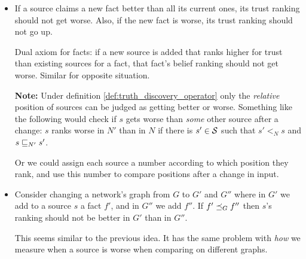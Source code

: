 \documentclass[../main.tex]{subfiles}
\begin{document}
\begin{itemize}
\item If a source claims a new fact better than all its current ones, its trust
ranking should not get worse. Also, if the new fact is worse, its trust ranking
should not go up.

Dual axiom for facts: if a new source is added that ranks higher for trust than
existing sources for a fact, that fact's belief ranking should not get worse.
Similar for opposite situation.

\textbf{Note:} Under definition \ref{def:truth_discovery_operator} only the
\emph{relative} position of sources can be judged as getting better or worse.
Something like the following would check if $s$ gets worse than \emph{some}
other source after a change: $s$ ranks worse in $N'$ than in $N$ if there is
$s' \in \S$ such that $s' <_N s$ and $s \sle_{N'} s'$.

Or we could assign each source a number according to which position they rank,
and use this number to compare positions after a change in input.

\item Consider changing a network's graph from $G$ to $G'$ and $G''$ where in
$G'$ we add to a source $s$ a fact $f'$, and in $G''$ we add $f''$. If $f'
\fle_G f''$ then $s$'s ranking should not be better in $G'$ than in $G''$.

This seems similar to the previous idea. It has the same problem with
\emph{how} we measure when a source is worse when comparing on different graphs.

\end{itemize}
\end{document}
